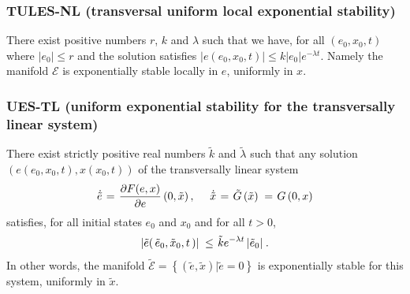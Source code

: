 \documentclass[letterpaper, 10 pt, conference]{ieeeconf}
\renewcommand{\l}    {{\lambda}}
\newcommand{\m}      {{\hbox{\hskip 1pt}}}
\newcommand{\Emscr}  {{\mathcal{E}}}
\begin{document}
\subsubsection{TULES-NL (transversal uniform local exponential 
stability)} There exist positive numbers $r$, $k$ and $\l$ such that
we have, for all $\left(e_0, x_0, t\right)$ where $\left| e_0\right|
\le r$ and the solution satisfies $\left|e\left(e_0, x_0,
t\right)\right| \le k\left|e_0\right| e^{-\l t}$. Namely the
manifold $\mathscr{E}$ is exponentially stable locally in $e$,
uniformly in $x$.
\subsubsection{UES-TL (uniform exponential stability for the 
transversally linear system)} There exist strictly positive real 
numbers $\tilde{k}$ and $\tilde{\l}$ such that any solution $\left(e 
\left(e_0,x_0,t\right),x\left(x_0, t\right)\right)$ of the 
transversally linear system
$$ \dot{\tilde{e}} \m=\m \frac{\partial F(e,x)}{\partial e}
   \left(0,\tilde{x}\right),\quad\ \dot{\tilde{x}} \m=\m \tilde{G}
   \left(\tilde{x}\right) \m=\m G\left(0,x\right)$$
satisfies, for all initial states $e_0$ and $x_0$ and for all $t>0$,
$$ \left| \tilde{e}\right(\tilde{e}_0,\tilde{x}_0,t \left) \right| 
   \m\leq\m \tilde{k} e^{-\l t} \left| \tilde{e}_0\right| \m.$$ 
In other words, the manifold $\tilde{\Emscr}=\left\{\left(\tilde{e},
\tilde{x} \right)| \tilde{e} = 0 \right\}$ is exponentially stable 
for this system, uniformly in $\tilde{x}$.
\end{document}
